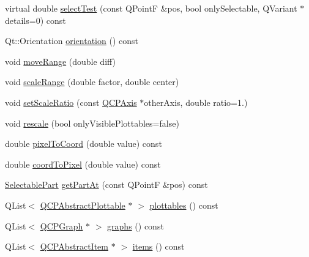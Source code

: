 \begin{DoxyCompactItemize}
virtual double \hyperlink{class_q_c_p_axis_a2877a6230920c118be65c6113089f467}{select\+Test} (const Q\+Point\+F \&pos, bool only\+Selectable, Q\+Variant $\ast$details=0) const 
\item 
Qt\+::\+Orientation \hyperlink{class_q_c_p_axis_a57483f2f60145ddc9e63f3af53959265}{orientation} () const 
\item 
void \hyperlink{class_q_c_p_axis_a18f3a68f2b691af1fd34b6593c886630}{move\+Range} (double diff)
\item 
void \hyperlink{class_q_c_p_axis_a7072ff96fe690148f1bbcdb4f773ea1c}{scale\+Range} (double factor, double center)
\item 
void \hyperlink{class_q_c_p_axis_af4bbd446dcaee5a83ac30ce9bcd6e125}{set\+Scale\+Ratio} (const \hyperlink{class_q_c_p_axis}{Q\+C\+P\+Axis} $\ast$other\+Axis, double ratio=1.)
\item 
void \hyperlink{class_q_c_p_axis_a499345f02ebce4b23d8ccec96e58daa9}{rescale} (bool only\+Visible\+Plottables=false)
\item 
double \hyperlink{class_q_c_p_axis_ae9289ef7043b9d966af88eaa95b037d1}{pixel\+To\+Coord} (double value) const 
\item 
double \hyperlink{class_q_c_p_axis_a985ae693b842fb0422b4390fe36d299a}{coord\+To\+Pixel} (double value) const 
\item 
\hyperlink{class_q_c_p_axis_abee4c7a54c468b1385dfce2c898b115f}{Selectable\+Part} \hyperlink{class_q_c_p_axis_ab2965a8ab1da948b897f1c006080760b}{get\+Part\+At} (const Q\+Point\+F \&pos) const 
\item 
Q\+List$<$ \hyperlink{class_q_c_p_abstract_plottable}{Q\+C\+P\+Abstract\+Plottable} $\ast$ $>$ \hyperlink{class_q_c_p_axis_a4f7404494cccdbfc00e1e865b7ed16a4}{plottables} () const 
\item 
Q\+List$<$ \hyperlink{class_q_c_p_graph}{Q\+C\+P\+Graph} $\ast$ $>$ \hyperlink{class_q_c_p_axis_ad3919e7d7400f55446ea82018fe5e3a8}{graphs} () const 
\item 
Q\+List$<$ \hyperlink{class_q_c_p_abstract_item}{Q\+C\+P\+Abstract\+Item} $\ast$ $>$ \hyperlink{class_q_c_p_axis_ae437656a5fd1a03721a8f2d7aab460fe}{items} () const 
\end{DoxyCompactItemize}

